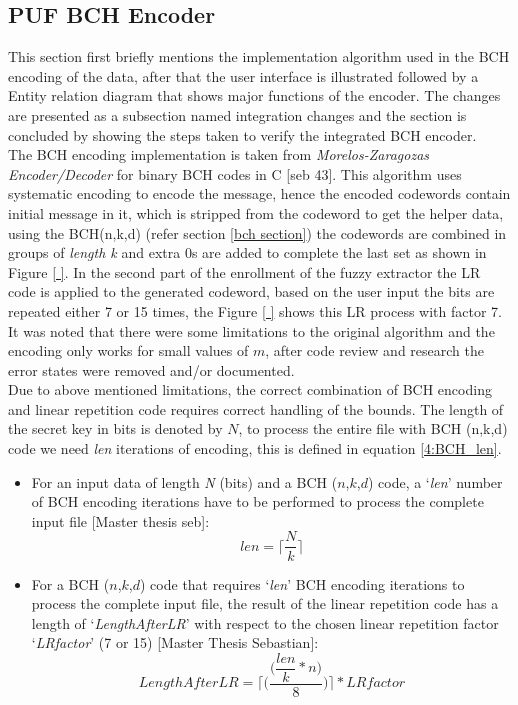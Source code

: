 \subsection{PUF BCH Encoder}
This section first briefly mentions the implementation algorithm used in the BCH encoding of the data, after that the user interface is illustrated followed by a Entity relation diagram that shows major functions of the encoder. The changes are presented as a subsection named integration changes and the section is concluded by showing the steps taken to verify the integrated BCH encoder.\\

The BCH encoding implementation is taken from \emph{Morelos-Zaragozas Encoder/Decoder} for binary BCH codes in C [seb 43]. This algorithm uses systematic encoding to encode the message, hence the encoded codewords contain initial message in it, which is stripped from the codeword to get the helper data, using the BCH(n,k,d) (refer section \ref{bch section}) the codewords are combined in groups of \emph{length k} and extra 0s are added to complete the last set as shown in Figure \ref{ }. In the
second part of the enrollment of the fuzzy extractor the LR code is applied to the generated codeword, based on the user input the bits are repeated either 7 or 15 times, the Figure \ref{ } shows this LR process with factor 7. It was noted that there were some limitations to the original algorithm and the encoding only works for small values of $m$, after code review and research the error states were removed and/or documented.\\

Due to above mentioned limitations, the correct combination of BCH encoding and linear repetition code requires correct handling of the bounds. The length of the secret key in bits is denoted by $N$, to process the entire file with BCH (n,k,d) code we need \emph{len} iterations of encoding, this is defined in equation \ref{4:BCH_len}.

\begin{itemize}
	\item For an input data of length \emph{N} (bits) and a BCH ($n$,$k$,$d$) code, a ‘\emph{len}’ number of BCH encoding iterations have to be performed to process the complete input file [Master thesis seb]:
\begin{equation}
	len =\Bigg\lceil\dfrac{N}{k}\Bigg\rceil
	\label{4:BCH_len}
\end{equation}

\item For a BCH ($n$,$k$,$d$) code that requires ‘\emph{len}’ BCH encoding iterations to process the complete input file, the result of the linear repetition code has a length of ‘\emph{LengthAfterLR}’ with respect to the chosen linear repetition factor ‘\emph{LRfactor}’ (7 or 15) [Master Thesis Sebastian]:
\begin{equation}
	LengthAfterLR = \Bigg\lceil\Bigg(\dfrac{\Bigg(\dfrac{len}{k} * n\Bigg)}{8}\Bigg)\Bigg\rceil * LRfactor
\label{4:BCH_LR_len}
\end{equation}
\end{itemize}

